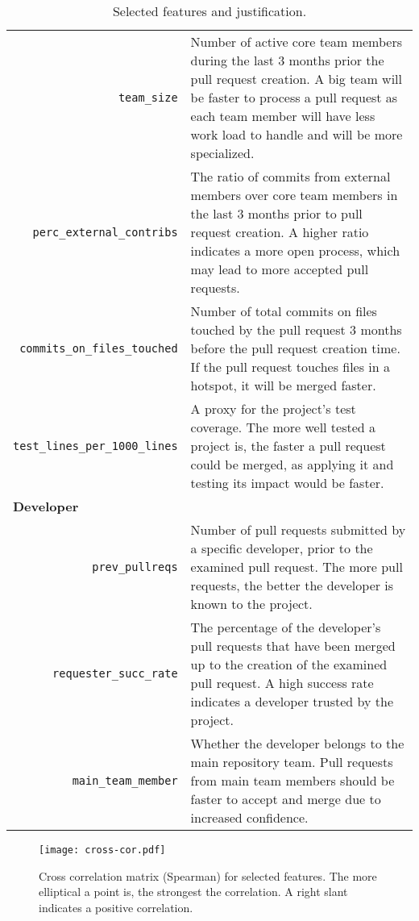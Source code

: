 \documentclass{acm_proc_article-sp}
\begin{document}
\begin{table*}
\begin{small}
\begin{tabular}{rp{40em}}
    \texttt{team\_size} & Number of active core team members during the last
    3 months prior the pull request creation. A big team will be faster to process a
    pull request as each team member will have less work load to handle and
    will be more specialized.\\

    \texttt{perc\_external\_contribs} & The ratio of commits from external
    members over core team members in the last 3 months prior to pull request
    creation. A higher ratio indicates a more open
    process, which may lead to more accepted pull requests.\\

    \texttt{commits\_on\_files\_touched} & Number of total commits on files
    touched by the pull request 3 months before the pull request creation time.
    If the pull request touches files in a hotspot, it will be merged faster.\\
 
    \texttt{test\_lines\_per\_1000\_lines} & A proxy for the project's test
    coverage. The more well tested a project is, the faster a pull request
    could be merged, as applying it and testing its impact would be faster. \\

    \multicolumn{2}{l}{\bf{Developer}}\\
    
    \texttt{prev\_pullreqs} & Number of pull requests submitted by a specific
    developer, prior to the examined pull request. The more pull requests, the
    better the developer is known to the project.\\

    \texttt{requester\_succ\_rate} & The percentage of the developer's pull requests that have been merged up to the creation of the examined pull
    request. A high success rate indicates a developer trusted by the project.\\

    \texttt{main\_team\_member} & Whether the developer belongs to the
    main repository team. Pull requests from main team members should be
    faster to accept and merge due to increased confidence.\\
    \hline
  \end{tabular}
  \caption{Selected features and justification.}
  \label{tab:features}
  \end{small}
\end{table*}


\begin{figure}
  \begin{center}
    \texttt{[image: cross-cor.pdf]}
  \end{center}
  \caption{Cross correlation matrix (Spearman) for selected features. The more elliptical a point is, the strongest the correlation. A right slant indicates
  a positive correlation.}
  \label{fig:crosscor}
\end{figure}
\end{document}
